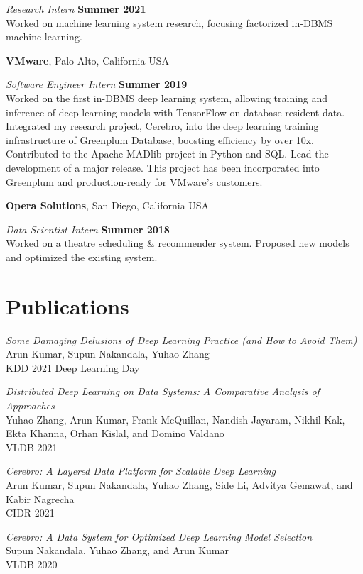 \documentclass[margin,line]{res}
\begin{document}
\begin{resume}
\vspace{-.3cm}
{\em Research Intern} \hfill {\bf Summer 2021}\\
Worked on machine learning system research, focusing factorized in-DBMS machine learning.


{\bf VMware}, Palo Alto, California USA

\vspace{-.3cm}
{\em Software Engineer Intern} \hfill {\bf Summer 2019}\\
Worked on the first in-DBMS deep learning system, allowing training and inference of deep learning models with TensorFlow on database-resident data. Integrated my research project, Cerebro, into the deep learning training infrastructure of Greenplum Database, boosting efficiency by over 10x. Contributed to the Apache MADlib project in Python and SQL. Lead the development of a major release. This project has been incorporated into Greenplum and production-ready for VMware's customers.

{\bf Opera Solutions}, San Diego, California USA

\vspace{-.3cm}
{\em Data Scientist Intern} \hfill {\bf Summer 2018}\\
Worked on a theatre scheduling \& recommender system. Proposed new models and optimized the existing system.

\section{\sc Publications}
\textit{Some Damaging Delusions of Deep Learning Practice (and How to Avoid Them)}\\
Arun Kumar, Supun Nakandala, Yuhao Zhang\\
KDD 2021 Deep Learning Day

\textit{Distributed Deep Learning on Data Systems: A Comparative Analysis of Approaches}\\
Yuhao Zhang, Arun Kumar, Frank McQuillan, Nandish Jayaram, Nikhil Kak, Ekta Khanna, Orhan Kislal, and Domino Valdano\\
VLDB 2021

\textit{Cerebro: A Layered Data Platform for Scalable Deep Learning}\\
Arun Kumar, Supun Nakandala, Yuhao Zhang, Side Li, Advitya Gemawat, and Kabir Nagrecha\\
CIDR 2021

\textit{Cerebro: A Data System for Optimized Deep Learning Model Selection}\\
Supun Nakandala, Yuhao Zhang, and Arun Kumar\\
VLDB 2020


\end{resume}
\end{document}
